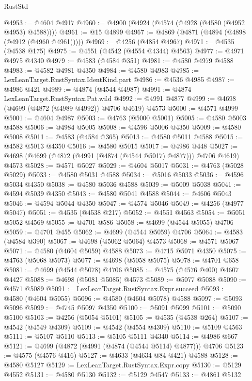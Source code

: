 \begin{lexlean}{RustStd}
\begin{coremodule}
@4953 := @4604 @4917
@4960 := @4900 (@4924 (@4574 (@4928 (@4580 (@4952 @4953) @4588))))
@4961 := @15 @4899
@4967 := @4869 (@4871 (@4894 (@4898 (@4912 (@4960 @4961)))))
@4969 := @4256 (@4854 @4967)
@4971 := @4535 (@4538 @175)
@4975 := @4551 (@4542 (@4554 @4344) @4563)
@4977 := @4971 @4975 @4340
@4979 := @4583 (@4584 @351)
@4981 := @4580 @4979 @4588
@4983 := @4582 @4981 @4350
@4984 := @4580 @4983
@4985 := LexLeanTarget.RustSyntax.IdentKind.part
@4986 := @4536 @4985
@4987 := @4986 @421
@4989 := @4874 (@4544 @4987)
@4991 := @4874 LexLeanTarget.RustSyntax.Pat.wild
@4992 := @4991 @4877
@4999 := @4698 (@4699 (@4872 (@4989 @4992)) @4706 @4619) @4573
@5000 := @4571 @4999
@5001 := @4604 @4987
@5003 := @4763 (@5000 @5001)
@5005 := @4580 @5003 @4588
@5006 := @4984 @5005
@5008 := @4596 @5006 @4350
@5009 := @4580 @5008
@5011 := @4583 (@4584 @365)
@5013 := @4580 @5011 @4588
@5015 := @4582 @5013 @4350
@5016 := @4580 @5015
@5017 := @4986 @448
@5027 := @4698 (@4699 (@4872 (@4991 (@4874 (@4544 @5017) @4877))) @4706 @4619) @4573
@5028 := @4571 @5027
@5029 := @4604 @5017
@5031 := @4763 (@5028 @5029)
@5033 := @4580 @5031 @4588
@5034 := @5016 @5033
@5036 := @4596 @5034 @4350
@5038 := @4580 @5036 @4588
@5039 := @5009 @5038
@5041 := @4594 @5039 @4350
@5043 := @4580 @5041 @4588
@5044 := @4606 @5043
@5046 := @4594 @5044 @4350
@5047 := @4574 @5046
@5049 := @4256 (@4977 @5047)
@5051 := @4535 (@4538 @217)
@5052 := @4551 @4563
@5054 := @5051 @5052 @4569
@5055 := @4701 @586
@5058 := @4699 (@4544 @5055) @4706
@5059 := @4701 @455
@5062 := @4699 (@4544 @5059) @4706
@5064 := @4583 (@4584 @390)
@5067 := @4698 (@5062 @5064) @4573
@5068 := @4571 @5067
@5071 := @4580 (@4604 @5059) @4588
@5073 := @4715 @5071 @4350
@5075 := @4763 (@5068 @5073)
@5077 := @4698 (@5058 @5075)
@5078 := @4701 @658
@5081 := @4699 (@4544 @5078) @4706
@5085 := @4575 (@4576 @400) @4607 @4427
@5088 := @4698 (@5081 @5085) @4573
@5089 := @5077 @5088
@5090 := @4571 @5089
@5091 := LexLeanTarget.RustSyntax.Expr.succeed
@5093 := @4580 (@4604 @5055)
@5096 := @4580 (@4604 @5078) @4588
@5097 := @5093 @5096
@5099 := @4745 @5097 @4350
@5100 := @5091 @5099
@5101 := @5090 @5100
@5103 := @4256 (@5054 @5101)
@5105 := @4535 (@4538 @264)
@5107 := @4542 (@4549 @4309)
@5109 := @4542 (@4554 @4309)
@5110 := @5109 @4563
@5111 := @5107 @5110
@5113 := @5105 @5111 @4340
@5114 := @4986 @667
@5121 := @4699 (@4872 (@4991 (@4874 (@4544 @5114) @4877))) @4706
@5123 := @4575 (@4576 @416)
@5127 := @4633 (@4634 @84 @421) @4588
@5128 := @4580 @5127
@5129 := LexLeanTarget.RustSyntax.Expr.copy
@5130 := @5129 @4552
@5131 := @4580 @5130
@5132 := @5129 @4547
@5133 := @4861 @5132

\end{coremodule}
\end{lexlean}
